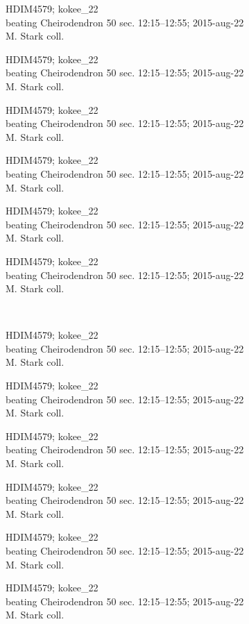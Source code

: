 \documentclass[2pt]{extarticle}
\begin{document}
\noindent
\parbox{0.16\textwidth}{\tiny \raggedright \rule[-0.3\baselineskip]{0pt}{10pt}HDIM4579; kokee\_22\\ beating Cheirodendron 50 sec. 12:15--12:55; 2015-aug-22\\ M. Stark coll.}
\parbox{0.16\textwidth}{\tiny \raggedright \rule[-0.3\baselineskip]{0pt}{10pt}HDIM4579; kokee\_22\\ beating Cheirodendron 50 sec. 12:15--12:55; 2015-aug-22\\ M. Stark coll.}
\parbox{0.16\textwidth}{\tiny \raggedright \rule[-0.3\baselineskip]{0pt}{10pt}HDIM4579; kokee\_22\\ beating Cheirodendron 50 sec. 12:15--12:55; 2015-aug-22\\ M. Stark coll.}
\parbox{0.16\textwidth}{\tiny \raggedright \rule[-0.3\baselineskip]{0pt}{10pt}HDIM4579; kokee\_22\\ beating Cheirodendron 50 sec. 12:15--12:55; 2015-aug-22\\ M. Stark coll.}
\parbox{0.16\textwidth}{\tiny \raggedright \rule[-0.3\baselineskip]{0pt}{10pt}HDIM4579; kokee\_22\\ beating Cheirodendron 50 sec. 12:15--12:55; 2015-aug-22\\ M. Stark coll.}
\parbox{0.16\textwidth}{\tiny \raggedright \rule[-0.3\baselineskip]{0pt}{10pt}HDIM4579; kokee\_22\\ beating Cheirodendron 50 sec. 12:15--12:55; 2015-aug-22\\ M. Stark coll.} \\ 
\vspace{0.001in} 

\noindent
\parbox{0.16\textwidth}{\tiny \raggedright \rule[-0.3\baselineskip]{0pt}{10pt}HDIM4579; kokee\_22\\ beating Cheirodendron 50 sec. 12:15--12:55; 2015-aug-22\\ M. Stark coll.}
\parbox{0.16\textwidth}{\tiny \raggedright \rule[-0.3\baselineskip]{0pt}{10pt}HDIM4579; kokee\_22\\ beating Cheirodendron 50 sec. 12:15--12:55; 2015-aug-22\\ M. Stark coll.}
\parbox{0.16\textwidth}{\tiny \raggedright \rule[-0.3\baselineskip]{0pt}{10pt}HDIM4579; kokee\_22\\ beating Cheirodendron 50 sec. 12:15--12:55; 2015-aug-22\\ M. Stark coll.}
\parbox{0.16\textwidth}{\tiny \raggedright \rule[-0.3\baselineskip]{0pt}{10pt}HDIM4579; kokee\_22\\ beating Cheirodendron 50 sec. 12:15--12:55; 2015-aug-22\\ M. Stark coll.}
\parbox{0.16\textwidth}{\tiny \raggedright \rule[-0.3\baselineskip]{0pt}{10pt}HDIM4579; kokee\_22\\ beating Cheirodendron 50 sec. 12:15--12:55; 2015-aug-22\\ M. Stark coll.}
\parbox{0.16\textwidth}{\tiny \raggedright \rule[-0.3\baselineskip]{0pt}{10pt}HDIM4579; kokee\_22\\ beating Cheirodendron 50 sec. 12:15--12:55; 2015-aug-22\\ M. Stark coll.} \\ 
\vspace{0.001in} 
\end{document}
